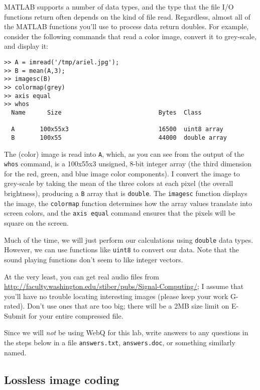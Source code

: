 MATLAB supports a number of data types, and the type that the file I/O
functions return often depends on the kind of file read. Regardless,
almost all of the MATLAB functions you'll use to process data return
doubles. For example, consider the following commands that read a
color image, convert it to grey-scale, and display it:
\begin{verbatim}
>> A = imread('/tmp/ariel.jpg');
>> B = mean(A,3);
>> imagesc(B)
>> colormap(grey)
>> axis equal
>> whos
  Name      Size                           Bytes  Class

  A       100x55x3                         16500  uint8 array
  B       100x55                           44000  double array
\end{verbatim}
The (color) image is read into \texttt{A}, which, as you can see from
the output of the \texttt{whos} command, is a 100x55x3 unsigned, 8-bit
integer array (the third dimension for the red, green, and blue image
color components). I convert the image to grey-scale by taking the
mean of the three colors at each pixel (the overall brightness),
producing a \texttt{B} array that is \texttt{double}. The
\texttt{imagesc} function displays the image, the \texttt{colormap}
function determines how the array values translate into screen colors,
and the \texttt{axis equal} command ensures that the pixels will be
square on the screen.

Much of the time, we will just perform our calculations using
\texttt{double} data types. However, we can use functions like
\texttt{uint8} to convert our data. Note that the sound playing
functions don't seem to like integer vectors.

At the very least, you can get real audio files from
\url{http://faculty.washington.edu/stiber/pubs/Signal-Computing/}; I assume that
you'll have no trouble locating interesting images (please keep your
work G-rated). Don't use ones that are too big; there will be a 2MB
size limit on E-Submit for your entire compressed file.

Since we will \emph{not} be using WebQ for this lab, write answers to
any questions in the steps below in a file \texttt{answers.txt},
\texttt{answers.doc}, or something similarly named.

\subsection{Lossless image coding}

